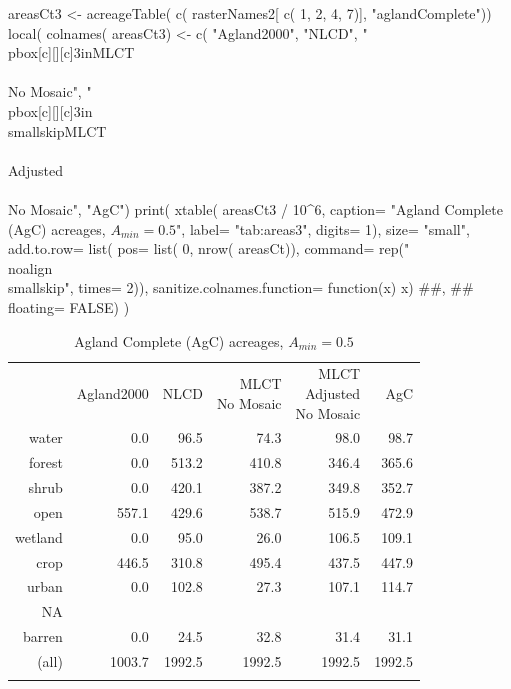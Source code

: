 \begin{Schunk}
\begin{Sinput}
 areasCt3 <- acreageTable( c( rasterNames2[ c( 1, 2, 4, 7)], "aglandComplete"))
 local({
   colnames( areasCt3) <- c( "Agland2000", "NLCD",
                            "\\pbox[c][][c]{3in}{MLCT\\\\No Mosaic}",
                            "\\pbox[c][][c]{3in}{\\smallskip{}MLCT\\\\Adjusted\\\\No Mosaic}",
                            "AgC")
   print( xtable( areasCt3 / 10^6, 
                 caption= "Agland Complete (AgC) acreages, $A_{min}=0.5$",
                 label= "tab:areas3",
                 digits= 1),
         size= "small",
         add.to.row= list( 
           pos= list( 0, nrow( areasCt)),
           command= rep("\\noalign{\\smallskip}", times= 2)),        
         sanitize.colnames.function= function(x) x)
   ##,
   ##      floating= FALSE)
 })
\end{Sinput}
\begin{table}[ht]
\begin{center}
{\small
\begin{tabular}{rrrrrr}
  \hline
 & Agland2000 & NLCD & \pbox[c][][c]{3in}{MLCT\\No Mosaic} & \pbox[c][][c]{3in}{\smallskip{}MLCT\\Adjusted\\No Mosaic} & AgC \\ 
  \noalign{\smallskip} \hline
water & 0.0 & 96.5 & 74.3 & 98.0 & 98.7 \\ 
  forest & 0.0 & 513.2 & 410.8 & 346.4 & 365.6 \\ 
  shrub & 0.0 & 420.1 & 387.2 & 349.8 & 352.7 \\ 
  open & 557.1 & 429.6 & 538.7 & 515.9 & 472.9 \\ 
  wetland & 0.0 & 95.0 & 26.0 & 106.5 & 109.1 \\ 
  crop & 446.5 & 310.8 & 495.4 & 437.5 & 447.9 \\ 
  urban & 0.0 & 102.8 & 27.3 & 107.1 & 114.7 \\ 
  NA &  &  &  &  &  \\ 
  barren & 0.0 & 24.5 & 32.8 & 31.4 & 31.1 \\ 
  (all) & 1003.7 & 1992.5 & 1992.5 & 1992.5 & 1992.5 \\ 
   \noalign{\smallskip} \hline
\end{tabular}
}
\caption{Agland Complete (AgC) acreages, $A_{min}=0.5$}
\label{tab:areas3}
\end{center}
\end{table}\begin{Sinput}
 
 
\end{Sinput}
\end{Schunk}


